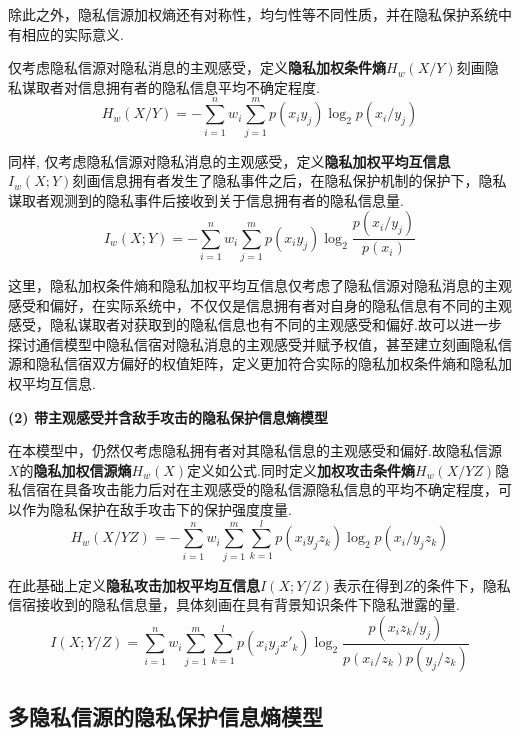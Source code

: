 除此之外，隐私信源加权熵还有对称性，均匀性等不同性质，并在隐私保护系统中有相应的实际意义.

仅考虑隐私信源对隐私消息的主观感受，定义\textbf{隐私加权条件熵}$H_{w}(X/Y)$刻画隐私谋取者对信息拥有者的隐私信息平均不确定程度.
\begin{equation}
H_{w}(X/Y)=-\sum_{i=1}^{n}w_{i}\sum_{j=1}^{m}p(x_{i}y_{j})\log_{2}p(x_{i}/y_{j})
\end{equation}

同样, 仅考虑隐私信源对隐私消息的主观感受，定义\textbf{隐私加权平均互信息}$I_{w}(X;Y)$刻画信息拥有者发生了隐私事件之后，在隐私保护机制的保护下，隐私谋取者观测到的隐私事件后接收到关于信息拥有者的隐私信息量.
\begin{equation}
I_{w}(X;Y)=-\sum_{i=1}^{n}w_{i}\sum_{j=1}^{m}p(x_{i}y_{j})\log_{2}\frac{p(x_{i}/y_{j})}{p(x_{i})}
\end{equation}

这里，隐私加权条件熵和隐私加权平均互信息仅考虑了隐私信源对隐私消息的主观感受和偏好，在实际系统中，不仅仅是信息拥有者对自身的隐私信息有不同的主观感受，隐私谋取者对获取到的隐私信息也有不同的主观感受和偏好.故可以进一步探讨通信模型中隐私信宿对隐私消息的主观感受并赋予权值，甚至建立刻画隐私信源和隐私信宿双方偏好的权值矩阵，定义更加符合实际的隐私加权条件熵和隐私加权平均互信息.

\textbf{(2) 带主观感受并含敌手攻击的隐私保护信息熵模型}

在本模型中，仍然仅考虑隐私拥有者对其隐私信息的主观感受和偏好.故隐私信源$X$的\textbf{隐私加权信源熵}$H_{w}(X)$定义如公式.同时定义\textbf{加权攻击条件熵}$H_{w}(X/YZ)$隐私信宿在具备攻击能力后对在主观感受的隐私信源隐私信息的平均不确定程度，可以作为隐私保护在敌手攻击下的保护强度度量.
\begin{equation}
H_{w}(X/YZ)=-\sum_{i=1}^{n}w_{i}\sum_{j=1}^{m}\sum_{k=1}^{l}p(x_{i}y_{j}z_{k})\log_{2}p(x_{i}/y_{j}z_{k})
\end{equation}

在此基础上定义\textbf{隐私攻击加权平均互信息}$I(X;Y/Z)$表示在得到$Z$的条件下，隐私信宿接收到的隐私信息量，具体刻画在具有背景知识条件下隐私泄露的量.
\begin{equation}
I(X;Y/Z)=\sum_{i=1}^{n}w_{i}\sum_{j=1}^{m}\sum_{k=1}^{l}p(x_{i}y_{j}{x}'_{k})\log_{2}\frac{p(x_{i}z_{k}/y_{j})}{p(x_{i}/z_{k})p(y_{j}/z_{k})}
\end{equation}

\subsection{多隐私信源的隐私保护信息熵模型}

